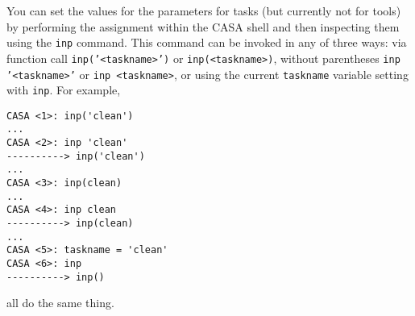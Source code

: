 You can set the values for the parameters for tasks (but currently not
for tools) by performing the assignment within the CASA shell and then
inspecting them using the {\tt inp} command.  This command can be
invoked in any of three ways: 
via function call {\tt inp('<taskname>')} or {\tt inp(<taskname>)}, 
without parentheses {\tt inp '<taskname>'} or {\tt inp <taskname>},
or using the current {\tt taskname} variable setting with {\tt inp}.
For example,
\small
\begin{verbatim}
CASA <1>: inp('clean')
...
CASA <2>: inp 'clean'
----------> inp('clean')
...
CASA <3>: inp(clean)
...
CASA <4>: inp clean
----------> inp(clean)
...
CASA <5>: taskname = 'clean'
CASA <6>: inp
----------> inp()
\end{verbatim}
\normalsize
all do the same thing. 

% 



